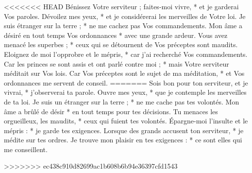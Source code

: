 <<<<<<< HEAD
Bénissez Votre serviteur ; faites-moi vivre, * et je garderai Vos paroles.
\versseparator
Dévoilez mes yeux, * et je considérerai les merveilles de Votre loi.
\versseparator
Je suis étranger sur la terre ; * ne me cachez pas Vos commandements.
\versseparator
Mon âme a désiré en tout temps Vos ordonnances * avec une grande ardeur.
\versseparator
Vous avez menacé les superbes ; * ceux qui se détournent de Vos préceptes sont maudits.
\versseparator
Eloignez de moi l'opprobre et le mépris, * car j'ai recherché Vos commandements.
\versseparator
Car les princes se sont assis et ont parlé contre moi ; * mais Votre serviteur méditait sur Vos lois.
\versseparator
Car Vos préceptes sont le sujet de ma méditation, * et Vos ordonnances me servent de conseil.
=======
Sois bon pour ton serviteur, et je vivrai, *
j’observerai ta parole.
\versseparator
Ouvre mes yeux, *
que je contemple les merveilles de ta loi.
\versseparator
Je suis un étranger sur la terre ; *
ne me cache pas tes volontés.
\versseparator
Mon âme a brûlé de désir *
en tout temps pour tes décisions.
\versseparator
Tu menaces les orgueilleux, les maudits, *
ceux qui fuient tes volontés.
\versseparator
Épargne-moi l’insulte et le mépris : *
je garde tes exigences.
\versseparator
Lorsque des grands accusent ton serviteur, *
je médite sur tes ordres.
\versseparator
Je trouve mon plaisir en tes exigences : *
ce sont elles qui me conseillent.

>>>>>>> ec438c910d82699ac1b608b6b94e36397cfd1543

